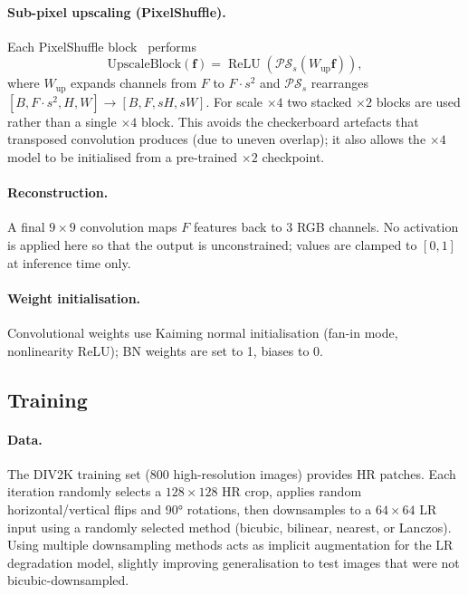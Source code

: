 \documentclass{article}
\begin{document}
\paragraph{Sub-pixel upscaling (PixelShuffle).}
Each PixelShuffle block~\cite{shi2016real} performs
\begin{equation}
  \text{UpscaleBlock}(\mathbf{f}) =
  \operatorname{ReLU}\!\left(
    \mathcal{PS}_s\!\left(W_{\text{up}} \mathbf{f}\right)
  \right),
\end{equation}
where $W_{\text{up}}$ expands channels from $F$ to $F \cdot s^2$ and
$\mathcal{PS}_s$ rearranges
$[B, F{\cdot}s^2, H, W] \to [B, F, sH, sW]$.
For scale $\times 4$ two stacked $\times 2$ blocks are used rather than a
single $\times 4$ block.
This avoids the checkerboard artefacts that transposed convolution produces
(due to uneven overlap); it also allows the $\times 4$ model to be initialised
from a pre-trained $\times 2$ checkpoint.

\paragraph{Reconstruction.}
A final $9{\times}9$ convolution maps $F$ features back to 3 RGB channels.
No activation is applied here so that the output is unconstrained; values
are clamped to $[0,1]$ at inference time only.

\paragraph{Weight initialisation.}
Convolutional weights use Kaiming normal initialisation (fan-in mode,
nonlinearity ReLU); BN weights are set to 1, biases to 0.

\subsection{Training}

\paragraph{Data.}
The DIV2K training set (800 high-resolution images) provides HR patches.
Each iteration randomly selects a $128{\times}128$ HR crop, applies random
horizontal/vertical flips and 90° rotations, then downsamples to a
$64{\times}64$ LR input using a randomly selected method (bicubic, bilinear,
nearest, or Lanczos).
Using multiple downsampling methods acts as implicit augmentation for the LR
degradation model, slightly improving generalisation to test images that were
not bicubic-downsampled.
\end{document}
